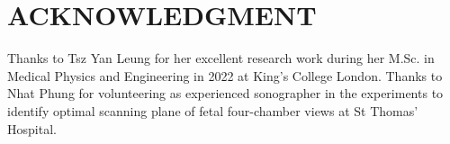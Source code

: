 \documentclass[a4paper, 10pt, conference]{ieeeconf}      %
\begin{document}

\section*{ACKNOWLEDGMENT}
Thanks to Tsz Yan Leung for her excellent research work  during her M.Sc. in Medical Physics and Engineering in 2022 at King's College London.
Thanks to Nhat Phung for volunteering as experienced sonographer in the experiments to identify optimal scanning plane of fetal four-chamber views at St Thomas' Hospital. 


\end{document}
